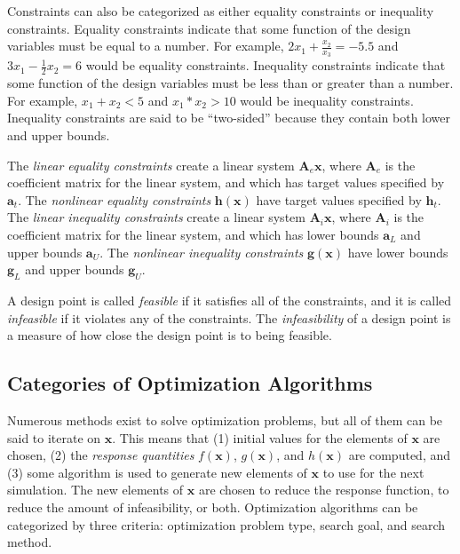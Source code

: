 Constraints can also be categorized as either equality constraints or inequality constraints.
Equality constraints indicate that some function of the design variables must be equal to a number.
For example, $2x_1 + \frac{x_2}{x_3} = -5.5$ and $3x_1 - \frac{1}{2}x_2 = 6$ would be equality constraints.
Inequality constraints indicate that some function of the design variables must be less than or greater than a number.
For example, $x_1 + x_2 < 5$ and $x_1 * x_2 > 10$ would be inequality constraints.
Inequality constraints are said to be ``two-sided'' because they contain both lower and upper bounds.

The \textit{linear equality constraints} create a linear system $\textbf{A}_e\textbf{x}$, where ${\textbf{A}_e}$ is the coefficient matrix for the linear system, and which has target values specified by ${\textbf{a}_t}$.
The \textit{nonlinear equality constraints} ${\textbf{h}\left(\textbf{x}\right)}$ have target values specified by $\textbf{h}_t$.
The \textit{linear inequality constraints} create a linear system $\textbf{A}_i\textbf{x}$, where ${\textbf{A}_i}$ is the coefficient matrix for the linear system, and which has lower bounds $\textbf{a}_L$ and upper bounds $\textbf{a}_U$.
The \textit{nonlinear inequality constraints} $\textbf{g}\left(\textbf{x}\right)$ have lower bounds $\textbf{g}_L$ and upper bounds $\textbf{g}_U$.

A design point is called \textit{feasible} if it satisfies all of the constraints, and it is called \textit{infeasible} if it violates any of the constraints.
The \textit{infeasibility} of a design point is a measure of how close the design point is to being feasible.

\subsection{Categories of Optimization Algorithms}
\label{sec:bg:opt:algs}

Numerous methods exist to solve optimization problems, but all of them can be said to iterate on $\textbf{x}$.
This means that (1) initial values for the elements of $\textbf{x}$ are chosen, (2) the \textit{response quantities} $f\left(\textbf{x}\right)$, $g\left(\textbf{x}\right)$, and $h\left(\textbf{x}\right)$ are computed, and (3) some algorithm is used to generate new elements of $\textbf{x}$ to use for the next simulation.
The new elements of $\textbf{x}$ are chosen to reduce the response function, to reduce the amount of infeasibility, or both.
Optimization algorithms can be categorized by three criteria: optimization problem type, search goal, and search method.

